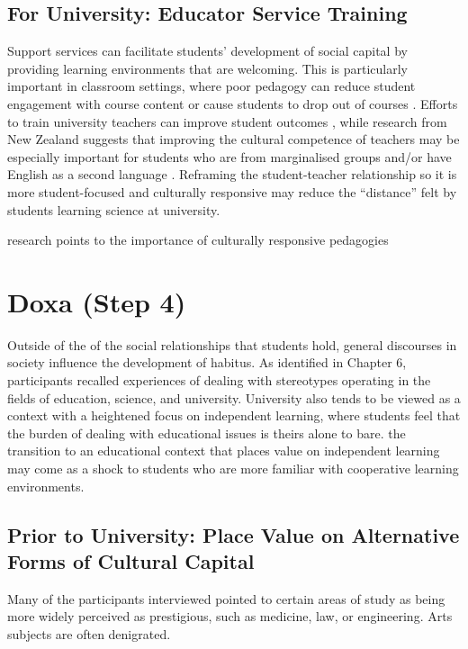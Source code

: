 \subsection{For University: Educator Service Training}
Support services can facilitate students' development of social capital by providing learning environments that are welcoming. This is particularly important in classroom settings, where poor pedagogy can reduce student engagement with course content or cause students to  drop out of courses \cite{russell2011factors}. Efforts to train university teachers can improve student outcomes \cite{gibbs2004impact}, while research from New Zealand suggests that improving the cultural competence of teachers may be especially important for students who are from marginalised groups \cite{ikiua2019pasifika} and/or have English as a second language \cite{campbell2008asian}. Reframing the student-teacher relationship so it is more student-focused \cite{gibbs2004impact} and culturally responsive \cite{ikiua2019pasifika} may reduce the ``distance'' felt by students learning science at university.  

research points to the importance of culturally responsive pedagogies \citep{glynn2010culturally}


\section{Doxa (Step 4)}
Outside of the of the social relationships that students hold, general discourses in society influence the development of habitus. As identified in Chapter 6, participants recalled experiences of dealing with stereotypes operating in the fields of education, science, and university. University also tends to be viewed as a context with a heightened focus on independent learning, where students feel that the burden of dealing with educational issues is theirs alone to bare. the transition to an educational context that places value on independent learning may come as a shock to students who are more familiar with cooperative learning environments.

\subsection{Prior to University: Place Value on Alternative Forms of Cultural Capital}
Many of the participants interviewed pointed to certain areas of study as being more widely perceived as prestigious, such as medicine, law, or engineering. Arts subjects are often denigrated. 

